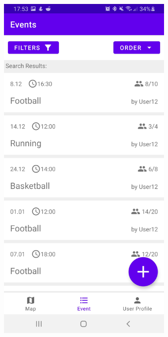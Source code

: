 \documentclass[aspectratio=169]{beamer}
\begin{document}
\begin{frame}
\begin{columns}
\begin{figure}
			\end{figure}
			 \begin{figure}
				\centering
				\includegraphics[width=1\textwidth]{media/Events.jpg}

\end{figure}
\end{columns}
\end{frame}
\end{document}
